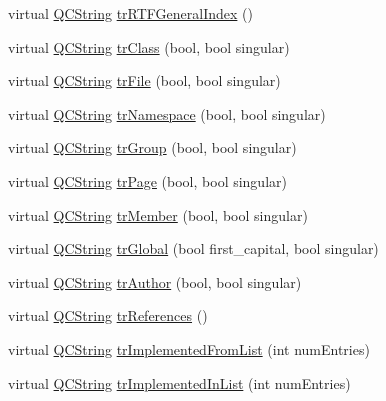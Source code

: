 \begin{DoxyCompactItemize}
\item 
virtual \mbox{\hyperlink{class_q_c_string}{Q\+C\+String}} \mbox{\hyperlink{class_translator_german_aa5da41acc42a3db2e34097853a8da92c}{tr\+R\+T\+F\+General\+Index}} ()
\item 
virtual \mbox{\hyperlink{class_q_c_string}{Q\+C\+String}} \mbox{\hyperlink{class_translator_german_ab518854eb67b22b895074c0f845bfe42}{tr\+Class}} (bool, bool singular)
\item 
virtual \mbox{\hyperlink{class_q_c_string}{Q\+C\+String}} \mbox{\hyperlink{class_translator_german_a395c5b6625eec8a81089f4659dca9243}{tr\+File}} (bool, bool singular)
\item 
virtual \mbox{\hyperlink{class_q_c_string}{Q\+C\+String}} \mbox{\hyperlink{class_translator_german_acdc1e5e621a20175271eb4854c66ab33}{tr\+Namespace}} (bool, bool singular)
\item 
virtual \mbox{\hyperlink{class_q_c_string}{Q\+C\+String}} \mbox{\hyperlink{class_translator_german_acfb9fb7a0daff6079b7ecb712f74054b}{tr\+Group}} (bool, bool singular)
\item 
virtual \mbox{\hyperlink{class_q_c_string}{Q\+C\+String}} \mbox{\hyperlink{class_translator_german_a5bac945a0f8b91fb34667d0724f69093}{tr\+Page}} (bool, bool singular)
\item 
virtual \mbox{\hyperlink{class_q_c_string}{Q\+C\+String}} \mbox{\hyperlink{class_translator_german_ae5e008b742cf250fce802f080cd5d509}{tr\+Member}} (bool, bool singular)
\item 
virtual \mbox{\hyperlink{class_q_c_string}{Q\+C\+String}} \mbox{\hyperlink{class_translator_german_ac202e603ffb1afdfd0d2d2b817a9a5bc}{tr\+Global}} (bool first\+\_\+capital, bool singular)
\item 
virtual \mbox{\hyperlink{class_q_c_string}{Q\+C\+String}} \mbox{\hyperlink{class_translator_german_a32cc23772522eef38aeb62dc83fc917d}{tr\+Author}} (bool, bool singular)
\item 
virtual \mbox{\hyperlink{class_q_c_string}{Q\+C\+String}} \mbox{\hyperlink{class_translator_german_afa0c2c427bb4da28b214853d71ce3e7f}{tr\+References}} ()
\item 
virtual \mbox{\hyperlink{class_q_c_string}{Q\+C\+String}} \mbox{\hyperlink{class_translator_german_a0db6c86a748459f9eec496aac897dd9f}{tr\+Implemented\+From\+List}} (int num\+Entries)
\item 
virtual \mbox{\hyperlink{class_q_c_string}{Q\+C\+String}} \mbox{\hyperlink{class_translator_german_aacb18d80b7a94846088c6bfd14c88d50}{tr\+Implemented\+In\+List}} (int num\+Entries)

\end{DoxyCompactItemize}
